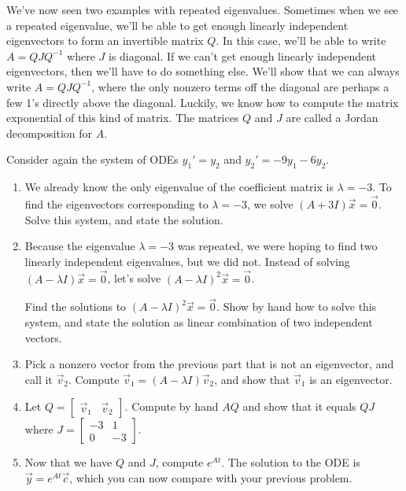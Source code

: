 We've now seen two examples with repeated eigenvalues.  Sometimes when we see a repeated eigenvalue, we'll be able to get enough linearly independent eigenvectors to form an invertible matrix $Q$. In this case, we'll be able to write $A=QJQ^{-1}$ where $J$ is diagonal. If we can't get enough linearly independent eigenvectors, then we'll have to do something else.  We'll show that we can always write $A=QJQ^{-1}$, where the only nonzero terms off the diagonal are perhaps a few 1's directly above the diagonal.  Luckily, we know how to compute the matrix exponential of this kind of matrix. The matrices $Q$ and $J$ are called a Jordan decomposition for $A$. 

\begin{problem}
 Consider again the system of ODEs $y_1' = y_2$ and $y_2'=-9y_1-6y_2$. 
\begin{enumerate}
 \item We already know the only eigenvalue of the coefficient matrix is $\lambda=-3$. To find the eigenvectors corresponding to $\lambda = -3$, we solve $(A+3 I)\vec x=\vec 0$. Solve this system, and state the solution.
 \item Because the eigenvalue $\lambda = -3$ was repeated, we were hoping to find two linearly independent eigenvalues, but we did not. Instead of solving $(A-\lambda I)\vec x=\vec 0$, let's solve $(A-\lambda I)^2\vec x=\vec 0$.
 
 Find the solutions to $(A-\lambda I)^2\vec x=\vec 0$. Show by hand how to solve this system, and state the solution as linear combination of two independent vectors.
 \item Pick a nonzero vector from the previous part that is not an eigenvector, and call it $\vec v_2$.  Compute $\vec v_1 = (A-\lambda I)\vec v_2$, and show that $\vec v_1$ is an eigenvector.
 \item Let $Q=\begin{bmatrix} \vec v_1 &\vec v_2\end{bmatrix}$. Compute by hand $AQ$ and show that it equals $QJ$ where $J= \begin{bmatrix}-3&1\\0&-3\end{bmatrix}$. 
 \item Now that we have $Q$ and $J$, compute $e^{At}$. The solution to the ODE is $\vec y=e^{At}\vec c$, which you can now compare with your previous problem.
\end{enumerate}
\end{problem}

